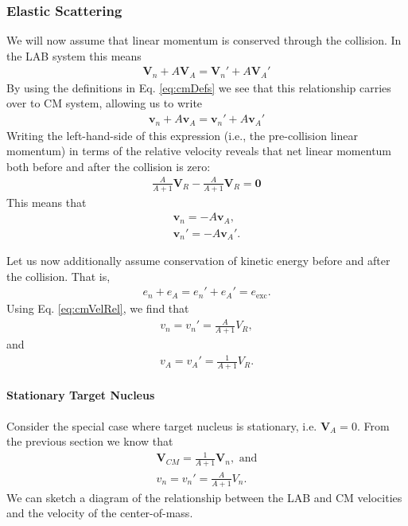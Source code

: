 \documentclass[11pt]{article}
\renewcommand\vec{\mathbf}
\begin{document}
\subsubsection{Elastic Scattering}
\label{sec:orgheadline4}
We will now assume that linear momentum is conserved through the collision.  In the LAB system this means
\begin{align}
  \vec{V}_n + A\vec{V}_A = \vec{V}_n' + A\vec{V}_A'
\end{align}
By using the definitions in Eq. \eqref{eq:cmDefs} we see that this relationship carries over to CM system, allowing us to write
\begin{align}
  \vec{v}_n + A\vec{v}_A = \vec{v}_n' + A\vec{v}_A'
\end{align}
Writing the left-hand-side of this expression (i.e., the pre-collision linear momentum) in terms of the relative velocity reveals that net linear momentum both before and after the collision is zero:
\begin{align}
  \frac{A}{A+1}\vec{V}_R - \frac{A}{A+1}\vec{V}_R = \vec{0}
\end{align}
This means that
\begin{align}
  \vec{v}_n = -A \vec{v}_A, \\
  \vec{v}_n' = -A \vec{v}_A'.
\end{align}

Let us now additionally assume conservation of kinetic energy before and after the collision.  That is, 
\begin{align}
  e_n + e_A = e_n' + e_A' = e_{\text{exc}}.
\end{align}
Using Eq. \eqref{eq:cmVelRel}, we find that 
\begin{align}
  v_n = v_n' = \frac{A}{A+1}V_R,
\end{align}
and
\begin{align}
  v_A = v_A' = \frac{1}{A+1}V_R.
\end{align}

\paragraph{Stationary Target Nucleus}
\label{sec:orgheadline3}
Consider the special case where target nucleus is stationary, i.e. \(\vec{V}_A = 0\).  From the previous section we know that
\begin{align}
  \vec{V}_{CM} = \frac{1}{A+1} \vec{V}_n, \text{ and} \\
  v_n = v_n' = \frac{A}{A+1}V_n.
\end{align}
We can sketch a diagram of the relationship between the LAB and CM velocities and the velocity of the center-of-mass.
\end{document}
